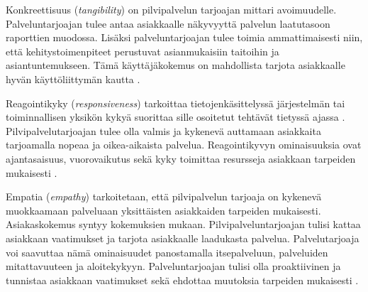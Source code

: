 Konkreettisuus (\emph{tangibility}) on pilvipalvelun tarjoajan mittari avoimuudelle. Palveluntarjoajan tulee antaa asiakkaalle näkyvyyttä palvelun laatutasoon raporttien muodossa. Lisäksi palveluntarjoajan tulee toimia ammattimaisesti niin, että kehitystoimenpiteet perustuvat asianmukaisiin taitoihin ja asiantuntemukseen. Tämä käyttäjäkokemus on mahdollista tarjota asiakkaalle hyvän käyttöliittymän kautta \citep{qualitymodel}.

Reagointikyky (\emph{responsiveness}) tarkoittaa tietojenkäsittelyssä järjestelmän tai toiminnallisen yksikön kykyä suorittaa sille osoitetut tehtävät tietyssä ajassa \citep{dictionary}. Pilvipalvelutarjoajan tulee olla valmis ja kykenevä auttamaan asiakkaita tarjoamalla nopeaa ja oikea-aikaista palvelua. Reagointikyvyn ominaisuuksia ovat ajantasaisuus, vuorovaikutus sekä kyky toimittaa resursseja asiakkaan tarpeiden mukaisesti \citep{qualitymodel}.

Empatia (\emph{empathy}) tarkoitetaan, että pilvipalvelun tarjoaja on kykenevä muokkaamaan palveluaan yksittäisten asiakkaiden tarpeiden mukaisesti. Asiakaskokemus syntyy kokemuksien mukaan. Pilvipalveluntarjoajan tulisi kattaa asiakkaan vaatimukset ja tarjota asiakkaalle laadukasta palvelua. Palvelutarjoaja voi saavuttaa nämä ominaisuudet panostamalla itsepalveluun, palveluiden mitattavuuteen ja aloitekykyyn. Palveluntarjoajan tulisi olla proaktiivinen ja tunnistaa asiakkaan vaatimukset sekä ehdottaa muutoksia tarpeiden mukaisesti \citep{qualitymodel}.
